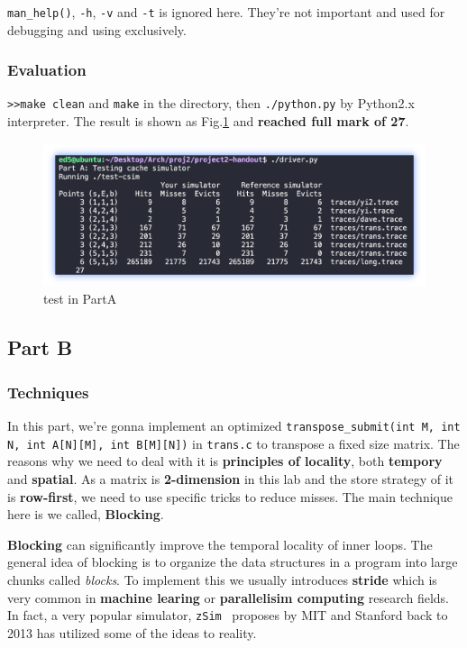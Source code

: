 \documentclass{article}
\begin{document}
\lstinline|man_help()|, \lstinline|-h|, \lstinline|-v| and \lstinline|-t| is ignored here. They're not important and used for debugging and using exclusively. 

\subsubsection{Evaluation}

\lstinline|>>make clean| and \lstinline|make| in the directory, then \lstinline|./python.py| by Python2.x interpreter. The result is shown as Fig.\ref{fig:1} and \textbf{reached full mark of 27}.
\begin{figure}[!h]
	\centering
	\includegraphics[width=\linewidth]{1}
	\caption{test in PartA}
	\label{fig:1}
\end{figure}

\subsection{Part B}

\subsubsection{Techniques}

In this part, we're gonna implement an optimized \lstinline|transpose_submit(int M, int N, int A[N][M], int B[M][N])| in \lstinline|trans.c| to transpose a fixed size matrix. The reasons why we need to deal with it is \textbf{principles of locality}, both \textbf{tempory} and \textbf{spatial}. As a matrix is \textbf{2-dimension} in this lab and the store strategy of it is \textbf{row-first}, we need to use specific tricks to reduce misses. The main technique here is we called, \textbf{Blocking}. 

\textbf{Blocking} can significantly improve the temporal locality of inner loops. The
general idea of blocking is to organize the data structures in a program into large chunks called \textit{blocks}. To implement this we usually introduces \textbf{stride} which is very common in \textbf{machine learing} or \textbf{parallelisim computing} research fields. In fact, a very popular simulator, \lstinline|zSim|~\cite{sanchez2013zsim} proposes by MIT and Stanford back to 2013 has utilized some of the ideas to reality. 
\end{document}
